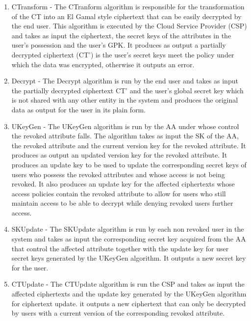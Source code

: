 \begin{enumerate}[label=(\arabic*)]
	\item CTransform - The CTranform algorithm is responsible for the transformation of the CT into an El Gamal style ciphertext that can be easily decrypted by the end user. This algorithm is executed by the Cloud Service Provider (CSP) and takes as input the ciphertext, the secret keys of the attributes in the user's possession and the user's GPK. It produces as output a partially decrypted ciphertext (CT') is the user's secret keys meet the policy under which the data was encrypted, otherwise it outputs an error.
	
	\item Decrypt - The Decrypt algorithm is run by the end user and takes as input the partially decrypted ciphertext CT' and the user's global secret key which is not shared with any other entity in the system and produces the original data as output for the user in its plain form.
	
	\item UKeyGen - The UKeyGen algorithm is run by the AA under whose control the revoked attribute falls. The algorithm takes as input the SK of the AA, the revoked attribute and the current version key for the revoked attribute. It produces as output an updated version key for the revoked attribute. It produces an update key to be used to update the corresponding secret keys of users who possess the revoked attributes and whose access is not being revoked. It also produces an update key for the affected ciphertexts whose access policies contain the revoked attribute to allow for users who still maintain access to be able to decrypt while denying revoked users further access.
	
	\item SKUpdate - The SKUpdate algorithm is run by each non revoked user in the system and takes as input the corresponding secret key acquired from the AA that control the affected attribute together with the update key for user secret keys generated by the UKeyGen algorithm. It outputs a new secret key for the user.
	
	\item CTUpdate - The CTUpdate algorithm is run the CSP and takes as input the affected ciphertexts and the update key generated by the UKeyGen algorithm for ciphertext update. it outputs a new ciphertext that can only be decrypted by users with a current version of the corresponding revoked attribute.
	
\end{enumerate}

